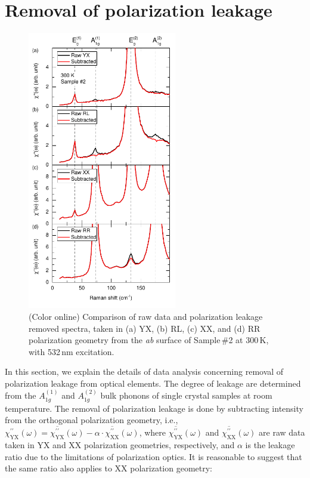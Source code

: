 \documentclass[reprint,aps,pra,superscriptaddress,amsmath,amssymb,linenumbers,longbibliography]{revtex4-1}
\begin{document}
\section{Removal of polarization leakage}
\begin{figure}[h]
	\includegraphics[width=6.5cm]{FigS1.pdf}
	\caption{\label{fig:S1}(Color online)
		Comparison of raw data and polarization leakage removed spectra, taken in (a) YX, (b) RL, (c) XX, and (d) RR polarization geometry from the \textit{ab} surface of Sample\,\#2 at 300\,K, with 532\,nm excitation.
	}
\end{figure}
In this section, we explain the details of data analysis concerning removal of polarization leakage from optical elements.
The degree of leakage are determined from the $A_{1g}^{(1)}$ and $A_{1g}^{(2)}$ bulk phonons of single crystal samples at room temperature.
The removal of polarization leakage is done by subtracting intensity from the orthogonal polarization geometry, i.e., $\chi_{\text{YX}}^{\prime\prime}(\omega)=\overline{\chi_{\text{YX}}^{\prime\prime}}(\omega)-\alpha\cdot\overline{\chi_{\text{XX}}^{\prime\prime}}(\omega)$, where $\overline{\chi_{\text{YX}}^{\prime\prime}}(\omega)$ and $\overline{\chi_{\text{XX}}^{\prime\prime}}(\omega)$ are raw data taken in YX and XX polarization geometries, respectively, and $\alpha$ is the leakage ratio due to the limitations of polarization optics. 
It is reasonable to suggest that the same ratio also applies to XX polarization geometry: 
\end{document}
